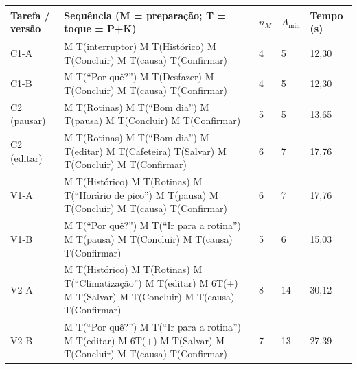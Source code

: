 \begin{tabularx}{\textwidth}{@{}P{1.6cm}YP{0.6cm}P{0.6cm}P{1.0cm}@{}}
\toprule
\textbf{Tarefa / versão} & \textbf{Sequência (M = preparação; T = toque = P+K)} & \textbf{$n_M$} & \textbf{$A_{\min}$} & \textbf{Tempo (s)} \\
\midrule
C1-A & M T(interruptor) M T(Histórico) M T(Concluir) M T(causa) T(Confirmar) & 4 & 5 & 12,30 \\
C1-B & M T(``Por quê?'') M T(Desfazer) M T(Concluir) M T(causa) T(Confirmar) & 4 & 5 & 12,30 \\
C2 (pausar) & M T(Rotinas) M T(``Bom dia'') M T(pausa) M T(Concluir) M T(Confirmar) & 5 & 5 & 13,65 \\
C2 (editar) & M T(Rotinas) M T(``Bom dia'') M T(editar) M T(Cafeteira) T(Salvar) M T(Concluir) M T(Confirmar) & 6 & 7 & 17,76 \\
V1-A & M T(Histórico) M T(Rotinas) M T(``Horário de pico'') M T(pausa) M T(Concluir) M T(causa) T(Confirmar) & 6 & 7 & 17,76 \\
V1-B & M T(``Por quê?'') M T(``Ir para a rotina'') M T(pausa) M T(Concluir) M T(causa) T(Confirmar) & 5 & 6 & 15,03 \\
V2-A & M T(Histórico) M T(Rotinas) M T(``Climatização'') M T(editar) M 6T($+$) M T(Salvar) M T(Concluir) M T(causa) T(Confirmar) & 8 & 14 & 30,12 \\
V2-B & M T(``Por quê?'') M T(``Ir para a rotina'') M T(editar) M 6T($+$) M T(Salvar) M T(Concluir) M T(causa) T(Confirmar) & 7 & 13 & 27,39 \\
\bottomrule
\end{tabularx}
